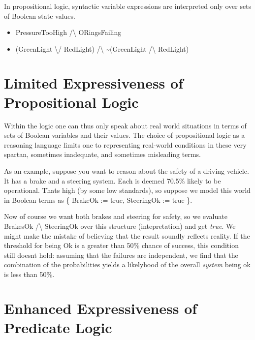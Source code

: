\documentclass{book}
\providecommand{\tightlist}{%
  \setlength{\itemsep}{0pt}\setlength{\parskip}{0pt}}
\begin{document}
In propositional logic, syntactic variable expressions
are interpreted only over sets of Boolean state values.

\begin{itemize}
\tightlist
\item
  PressureTooHigh /\textbackslash{} ORingsFailing
\item
  (GreenLight \textbackslash/ RedLight) /\textbackslash{} \textasciitilde(GreenLight /\textbackslash{} RedLight)
\end{itemize}

\hypertarget{book__pandoc__debug__src__predlogic.md__limited-expressiveness-of-propositional-logic}{%
\section*{Limited Expressiveness of Propositional Logic}\label{book__pandoc__debug__src__predlogic.md__limited-expressiveness-of-propositional-logic}}

Within the logic one can thus only speak about real world
situations in terms of sets of Boolean variables and their
values. The choice of propositional logic as a reasoning
language limits one to representing real-world conditions
in these very spartan, sometimes inadequate, and sometimes
misleading terms.

As an example, suppose you want to reason about the safety
of a driving vehicle. It has a brake and a steering system.
Each is deemed 70.5\% likely to be operational. That\textquotesingle s high
(by some low standards), so suppose we model this world in
Boolean terms as \{ BrakeOk := true, SteeringOk := true \}.

Now of course we want both brakes and steering for safety,
so we evaluate BrakesOk /\textbackslash{} SteeringOk over this structure
(intepretation) and get \emph{true}. We might make the mistake
of believing that the result soundly reflects reality. If
the threshold for being Ok is a greater than 50\% chance of
success, this condition still doesn\textquotesingle t hold: assuming that
the failures are independent, we find that the combination
of the probabilities yields a likelyhood of the overall
\emph{system} being ok is less than 50\%.

\hypertarget{book__pandoc__debug__src__predlogic.md__enhanced-expressiveness-of-predicate-logic}{%
\section*{Enhanced Expressiveness of Predicate Logic}\label{book__pandoc__debug__src__predlogic.md__enhanced-expressiveness-of-predicate-logic}}
\end{document}
